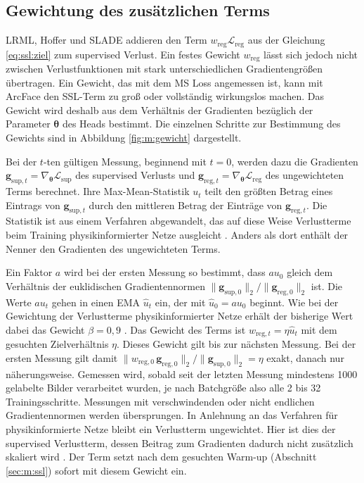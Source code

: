 \subsection{Gewichtung des zusätzlichen Terms}
\label{sec:m:gewicht}
\ac{LRML}, Hoffer und \ac{SLADE} addieren den Term $w_{\mathrm{reg}}\mathcal{L}_{\mathrm{reg}}$ aus der Gleichung \eqref{eq:ssl:ziel} zum supervised Verlust. Ein festes Gewicht $w_{\mathrm{reg}}$ lässt sich jedoch nicht zwischen Verlustfunktionen mit stark unterschiedlichen Gradientengrößen übertragen. Ein Gewicht, das mit dem \ac{MS} Loss angemessen ist, kann mit ArcFace den \ac{SSL}-Term zu groß oder vollständig wirkungslos machen. Das Gewicht wird deshalb aus dem Verhältnis der Gradienten bezüglich der Parameter $\bm{\theta}$ des Heads bestimmt. Die einzelnen Schritte zur Bestimmung des Gewichts sind in Abbildung \ref{fig:m:gewicht} dargestellt. 

Bei der $t$-ten gültigen Messung, beginnend mit $t=0$, werden dazu die Gradienten $\bm{g}_{\mathrm{sup},t}=\nabla_{\bm{\theta}}\mathcal{L}_{\mathrm{sup}}$ des supervised Verlusts und $\bm{g}_{\mathrm{reg},t}=\nabla_{\bm{\theta}}\mathcal{L}_{\mathrm{reg}}$ des ungewichteten Terms berechnet. Ihre Max-Mean-Statistik $u_t$ teilt den größten Betrag eines Eintrags von $\bm{g}_{\mathrm{sup},t}$ durch den mittleren Betrag der Einträge von $\bm{g}_{\mathrm{reg},t}$. Die Statistik ist aus einem Verfahren abgewandelt, das auf diese Weise Verlustterme beim Training physikinformierter Netze ausgleicht \cite{wang_understanding_2021-1}. Anders als dort enthält der Nenner den Gradienten des ungewichteten Terms.

Ein Faktor $a$ wird bei der ersten Messung so bestimmt, dass $a u_0$ gleich dem Verhältnis der euklidischen Gradientennormen $\lVert\bm{g}_{\mathrm{sup},0}\rVert_2/\lVert\bm{g}_{\mathrm{reg},0}\rVert_2$ ist. Die Werte $a u_t$ gehen in einen \ac{EMA} $\hat u_t$ ein, der mit $\hat u_0=a u_0$ beginnt. Wie bei der Gewichtung der Verlustterme physikinformierter Netze erhält der bisherige Wert dabei das Gewicht $\beta=0{,}9$ \cite{wang_understanding_2021-1}. Das Gewicht des Terms ist $w_{\mathrm{reg},t}=\eta\hat u_t$ mit dem gesuchten Zielverhältnis $\eta$. Dieses Gewicht gilt bis zur nächsten Messung. Bei der ersten Messung gilt damit $\lVert w_{\mathrm{reg},0}\,\bm{g}_{\mathrm{reg},0}\rVert_2/\lVert\bm{g}_{\mathrm{sup},0}\rVert_2=\eta$ exakt, danach nur näherungsweise. Gemessen wird, sobald seit der letzten Messung mindestens \num{1000} gelabelte Bilder verarbeitet wurden, je nach Batchgröße also alle 2 bis 32 Trainingsschritte. Messungen mit verschwindenden oder nicht endlichen Gradientennormen werden übersprungen. In Anlehnung an das Verfahren für physikinformierte Netze bleibt ein Verlustterm ungewichtet. Hier ist dies der supervised Verlustterm, dessen Beitrag zum Gradienten dadurch nicht zusätzlich skaliert wird \cite{wang_understanding_2021-1}. Der Term setzt nach dem gesuchten Warm-up (Abschnitt \ref{sec:m:ssl}) sofort mit diesem Gewicht ein.

